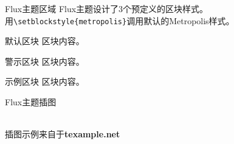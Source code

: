 \documentclass[t, aspectratio=169]{ctexbeamer}
\begin{document}
\begin{frame}[fragile]{Flux主题}{区域}
  Flux主题设计了3个预定义的区块样式。\\
  用\verb+\setblockstyle{metropolis}+调用默认的Metropolis样式。\\[0.5cm]
  
  \begin{center}
    \begin{minipage}[b]{0.5\textwidth}
      \begin{block}{默认区块}
        区块内容。
      \end{block}

      \begin{alertblock}{警示区块}
        区块内容。
      \end{alertblock}
    
      \begin{exampleblock}{示例区块}
        区块内容。
      \end{exampleblock}
    \end{minipage}
  \end{center}
\end{frame}

\begin{frame}{Flux主题}{插图}
  \centering
  \\[0.4cm]
  插图示例来自于\textbf{texample.net}
\end{frame}
\end{document}
